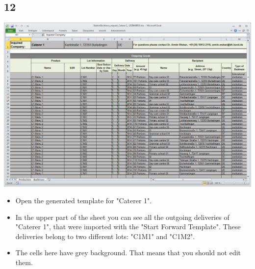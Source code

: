 \documentclass{beamer}
\begin{document}
\subsection{12}
\begin{frame}
	\begin{center}
  		\includegraphics[height=0.55\textwidth]{12.png}
	\end{center}
	\begin{itemize}
		\item Open the generated template for "Caterer 1".
		\item In the upper part of the sheet you can see all the outgoing deliveries of "Caterer 1", that were imported with the "Start Forward Template". These deliveries belong to two different lots: "C1M1" and "C1M2".
		\item The cells here have grey background. That means that you should not edit them.
	\end{itemize}
\end{frame}
\end{document}
